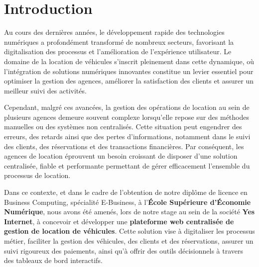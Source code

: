 \chapter*{Introduction}
 Au cours des dernières années, le développement rapide des technologies numériques a profondément transformé de nombreux secteurs, favorisant la digitalisation des processus et l’amélioration de l’expérience utilisateur. Le domaine de la location de véhicules s’inscrit pleinement dans cette dynamique, où l’intégration de solutions numériques innovantes constitue un levier essentiel pour optimiser la gestion des agences, améliorer la satisfaction des clients et assurer un meilleur suivi des activités.
 
 Cependant, malgré ces avancées, la gestion des opérations de location au sein de plusieurs agences demeure souvent complexe lorsqu’elle repose sur des méthodes manuelles ou des systèmes non centralisés. Cette situation peut engendrer des erreurs, des retards ainsi que des pertes d’informations, notamment dans le suivi des clients, des réservations et des transactions financières. Par conséquent, les agences de location éprouvent un besoin croissant de disposer d’une solution centralisée, fiable et performante permettant de gérer efficacement l’ensemble du processus de location.
 
 Dans ce contexte, et dans le cadre de l’obtention de notre diplôme de licence en Business Computing, spécialité E-Business, à l’\textbf{École Supérieure d’Économie Numérique}, nous avons été amenés, lors de notre stage au sein de la société \textbf{Yes Internet}, à concevoir et développer une \textbf{plateforme web centralisée de gestion de location de véhicules}. Cette solution vise à digitaliser les processus métier, faciliter la gestion des véhicules, des clients et des réservations, assurer un suivi rigoureux des paiements, ainsi qu’à offrir des outils décisionnels à travers des tableaux de bord interactifs.

